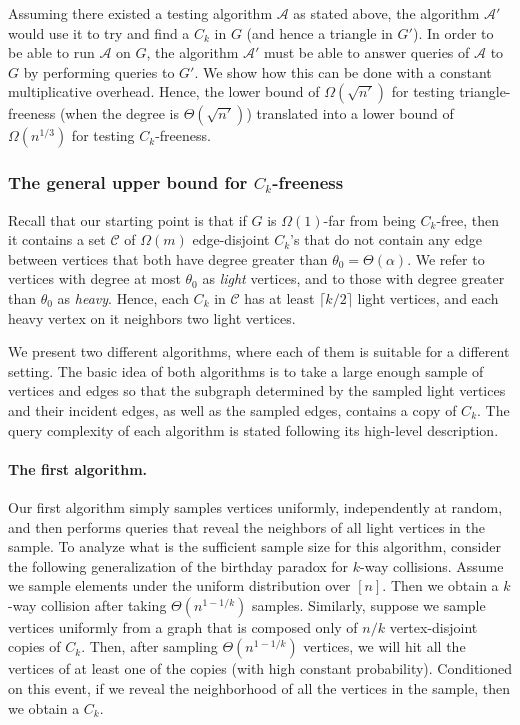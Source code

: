 \documentclass{article}
\newcommand{\eps}{\epsilon}
\newcommand{\calA}{{\mathcal{A}}}
\newcommand{\mA}{{\mathcal{A}}}
\newcommand{\calC}{{\mathcal{C}}}
\newcommand{\trn}{{n'}}
\newcommand{\trG}{{G'}}
\newcommand{\trA}{{\calA'}}
\newcommand{\commentt}[1]{ {}}
\newcommand{\ICALPCR}[1]{{#1}}
\begin{document}
Assuming there existed a testing algorithm $\mA$ as stated above, the algorithm $\trA$ would use it to try and find a $C_k$ in $G$ (and hence a triangle in $\trG$). In order to be able to run $\mA$ on $G$, the algorithm $\trA$ must be able to answer queries of $\mA$ to $G$ by performing queries to $\trG$. We show how this can be done with  a constant multiplicative overhead.
Hence, the lower bound of $\Omega(\sqrt{\trn})$ for testing triangle-freeness (when the degree is $\Theta(\sqrt{\trn})$) translated into a lower bound of $\Omega(n^{1/3})$ for testing $C_k$-freeness.



\subsubsection{The general upper bound for  $C_k$-freeness}
Recall that our starting point is that if $G$ is $\Omega(1)$-far from being $C_k$-free, then it contains a set $\calC$ of $\Omega(m)$ edge-disjoint $C_k$'s that do not contain any edge between vertices that both have degree greater than $\theta_0 = \Theta(\alpha)$. We refer to vertices with degree at most $\theta_0$ as \emph{light} vertices, and to those with degree greater than $\theta_0$ as \emph{heavy}.
Hence, each $C_k$ in $\calC$ has at least $\lceil k/2\rceil$ light vertices, and each heavy vertex
on it neighbors two light vertices.

We present two different algorithms, where each of them is suitable for a different setting. The basic idea of both algorithms is to take a large enough sample of vertices and edges so that the  subgraph determined by 
the sampled light vertices and their incident edges, as well as the sampled edges, contains a copy of $C_k$. \ICALPCR{The query complexity of each algorithm is stated following its high-level description.}

\paragraph{The first algorithm.}
Our first algorithm simply samples vertices uniformly, independently at random, and then performs queries that reveal the neighbors of all light vertices in the sample.
To analyze what is the sufficient sample size for this algorithm, consider the following generalization of the birthday paradox for $k$-way collisions. Assume we sample elements under the uniform distribution over $[n]$. Then we obtain a $k$-way collision after taking $\Theta(n^{1-1/k})$ samples.
Similarly, suppose  we sample vertices uniformly from a graph that is composed only of $n/k$  vertex-disjoint copies of $C_k$. Then, after sampling $\Theta(n^{1-1/k})$ vertices, we will hit all the vertices of at least one of the copies (with high constant probability).
Conditioned on this event, if we reveal the neighborhood of all the vertices in the sample, then  we obtain a $C_k$.
\end{document}
